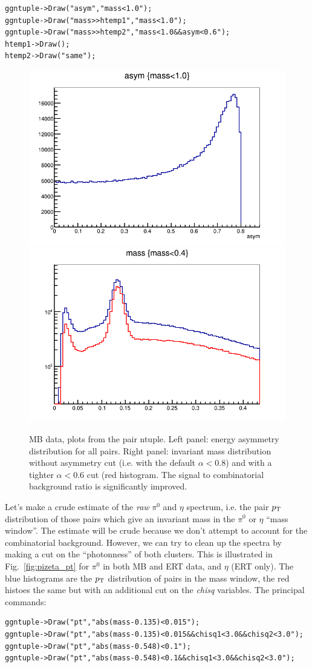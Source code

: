\documentclass[12pt,letterpaper,aps,prc,superscriptaddress,showpacs,
longbibliography,nofootinbib,floatfix,onecolumn]{revtex4-1}
\newcommand{\pt}{\mbox{$p_{\rm T}$}\xspace}
\newcommand{\piz}{\mbox{$\pi^0$}\xspace}
\begin{document}
\begin{verbatim}
ggntuple->Draw("asym","mass<1.0");
ggntuple->Draw("mass>>htemp1","mass<1.0");
ggntuple->Draw("mass>>htemp2","mass<1.0&&asym<0.6");
htemp1->Draw();
htemp2->Draw("same");
\end{verbatim}


\begin{center}
\begin{figure}[htbp]
  \includegraphics[width=0.4\linewidth]{figs/mbasym.png}
  \includegraphics[width=0.4\linewidth]{figs/mbinvmassasym.png}
  \caption{MB data, plots from the pair ntuple.  Left panel: energy
    asymmetry distribution for all pairs.  
    Right panel: invariant mass distribution without asymmetry cut
    (i.e. with the default $\alpha<0.8$) and with a tighter
    $\alpha<0.6$ cut (red histogram.  The signal to combinatorial
    background ratio is significantly improved.
  }
    \label{fig:asym_pt}
\end{figure}
\end{center}

Let's make a crude estimate of the {\it raw} \piz and $\eta$ spectrum,
i.e. the pair \pt distribution of those pairs which give an invariant
mass in the \piz or $\eta$ ``mass window''.  The estimate will be
crude because we don't attempt to account for the combinatorial
background.  However, we can try to clean up the spectra by making a
cut on the ``photonness'' of both clusters.  This is illustrated in
Fig.~\ref{fig:pizeta_pt} for \piz in both MB and ERT data, and $\eta$
(ERT only).  The blue histograms are the \pt distribution of pairs in
the mass window, the red histoes the same but with an additional cut
on the {\it chisq} variables.  The principal commands:

\begin{verbatim}
ggntuple->Draw("pt","abs(mass-0.135)<0.015");
ggntuple->Draw("pt","abs(mass-0.135)<0.015&&chisq1<3.0&&chisq2<3.0");
ggntuple->Draw("pt","abs(mass-0.548)<0.1");
ggntuple->Draw("pt","abs(mass-0.548)<0.1&&chisq1<3.0&&chisq2<3.0");
\end{verbatim}
\end{document}
